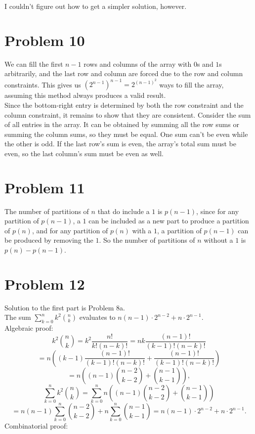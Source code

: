 \documentclass{article}
\begin{document}
I couldn't figure out how to get a simpler solution, however.

\section*{Problem 10}
We can fill the first $n - 1$ rows and columns of the array with $0$s and $1$s arbitrarily, and the last row and column are forced due to the row and column constraints. This gives us $(2^{n - 1})^{n - 1} = 2^{(n - 1)^2}$ ways to fill the array, assuming this method always produces a valid result. \\

Since the bottom-right entry is determined by both the row constraint and the column constraint, it remains to show that they are consistent. Consider the sum of all entries in the array. It can be obtained by summing all the row sums or summing the column sums, so they must be equal. One sum can't be even while the other is odd. If the last row's sum is even, the array's total sum must be even, so the last column's sum must be even as well.

\section*{Problem 11}
The number of partitions of $n$ that do include a $1$ is $p(n - 1)$, since for any partition of $p(n - 1)$, a $1$ can be included as a new part to produce a partition of $p(n)$, and for any partition of $p(n)$ with a $1$, a partition of $p(n - 1)$ can be produced by removing the $1$. So the number of partitions of $n$ without a $1$ is $p(n) - p(n - 1)$.

\section*{Problem 12}
Solution to the first part is Problem 8a. \\

The sum $\sum_{k = 0}^n k^2\binom{n}{k}$ evaluates to $n(n - 1)\cdot 2^{n - 2} + n\cdot 2^{n - 1}$. \\

Algebraic proof:
$$k^2\binom{n}{k} = k^2 \frac{n!}{k!(n - k)!} = nk\frac{(n - 1)!}{(k - 1)!(n - k)!}$$
$$= n\left((k - 1)\frac{(n - 1)!}{(k - 1)!(n - k)!} + \frac{(n - 1)!}{(k - 1)!(n - k)!}\right)$$
$$= n\left((n - 1)\binom{n - 2}{k - 2} + \binom{n - 1}{k - 1}\right),$$
$$\sum_{k = 0}^n k^2\binom{n}{k} = \sum_{k = 0}^n n\left((n - 1)\binom{n - 2}{k - 2} + \binom{n - 1}{k - 1}\right)$$
$$= n(n - 1)\sum_{k = 0}^n \binom{n - 2}{k - 2} + n\sum_{k = 0}^n\binom{n - 1}{k - 1} = n(n - 1)\cdot 2^{n - 2} + n\cdot 2^{n - 1}.$$
Combinatorial proof:
\end{document}
